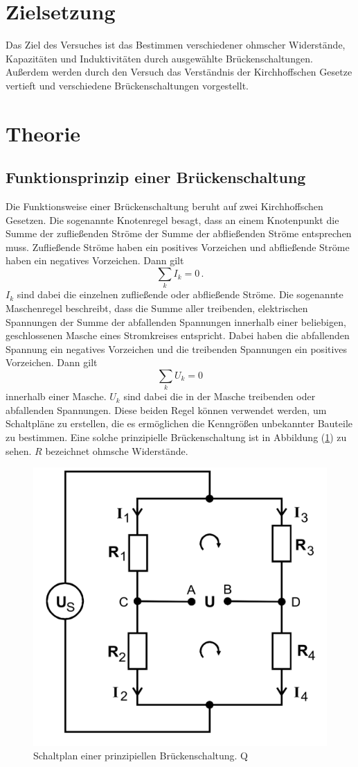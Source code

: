 \section{Zielsetzung}
\label{sec:Zielsetzung}
Das Ziel des Versuches ist das Bestimmen verschiedener ohmscher Widerstände, Kapazitäten und Induktivitäten durch ausgewählte Brückenschaltungen. Außerdem werden 
durch den Versuch das Verständnis der Kirchhoffschen Gesetze vertieft und verschiedene Brückenschaltungen vorgestellt.  

\section{Theorie}
\label{sec:Theorie}
    \subsection{Funktionsprinzip einer Brückenschaltung}
    Die Funktionsweise einer Brückenschaltung beruht auf zwei Kirchhoffschen Gesetzen. Die sogenannte Knotenregel besagt, dass an einem Knotenpunkt die Summe der 
    zufließenden Ströme der Summe der abfließenden Ströme entsprechen muss. Zufließende Ströme haben ein positives Vorzeichen und abfließende Ströme haben ein 
    negatives Vorzeichen. Dann gilt 
    \begin{equation*}
        \label{eqn:Knotenregel}
        \sum_k {I_k} = 0 \,.
    \end{equation*}
    $I_k$ sind dabei die einzelnen zufließende oder abfließende Ströme. 
    Die sogenannte Maschenregel beschreibt, dass die Summe aller treibenden, elektrischen Spannungen der Summe der abfallenden Spannungen innerhalb einer beliebigen, geschlossenen 
    Masche eines Stromkreises entspricht. Dabei haben die abfallenden Spannung ein negatives Vorzeichen und die treibenden Spannungen ein positives Vorzeichen. 
    Dann gilt
    \begin{equation*}
        \label{eqn:Maschenregel}
        \sum_k {U_k} = 0 
    \end{equation*}
    innerhalb einer Masche. $U_k$ sind dabei die in der Masche treibenden oder abfallenden Spannungen. 
    Diese beiden Regel können verwendet werden, um Schaltpläne zu erstellen, die es ermöglichen die Kenngrößen unbekannter Bauteile zu bestimmen. Eine 
    solche prinzipielle Brückenschaltung ist in Abbildung (\ref{pic:prinzipielle_Brückenschaltung}) zu sehen. $R$ bezeichnet ohmsche Widerstände.
    \begin{figure}[H]
        \centering
        \includegraphics[width=0.4\linewidth]{prinzipielle_Schaltung.png}
        \caption{Schaltplan einer prinzipiellen Brückenschaltung. Q\cite{anleitungV302}}
        \label{pic:prinzipielle_Brückenschaltung}
    \end{figure}
